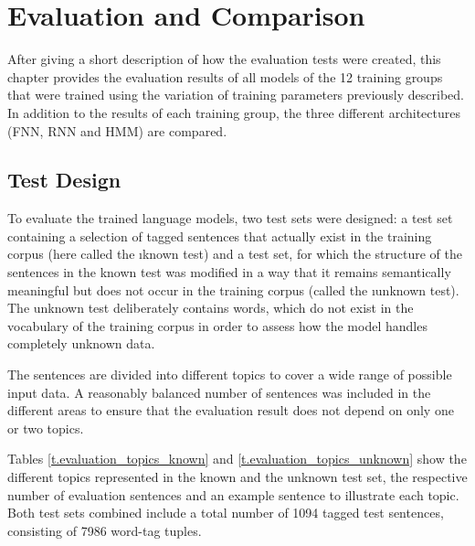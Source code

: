 \chapter{Evaluation and Comparison}\label{c.evaluation}
After giving a short description of how the evaluation tests were created, this chapter provides the evaluation results of all models of the 12 training groups that were trained using the variation of training parameters previously described. In addition to the results of each training group, the three different architectures (FNN, RNN and HMM) are compared.

\section{Test Design}\label{c.evaluation.test}
To evaluate the trained language models, two test sets were designed: a test set containing a selection of tagged sentences that actually exist in the training corpus (here called the \i{known test}) and a test set, for which the structure of the sentences in the known test was modified in a way that it remains semantically meaningful but does not occur in the training corpus (called the \i{unknown test}). The unknown test deliberately contains words, which do not exist in the vocabulary of the training corpus in order to assess how the model handles completely unknown data.

The sentences are divided into different topics to cover a wide range of possible input data. A reasonably balanced number of sentences was included in the different areas to ensure that the evaluation result does not depend on only one or two topics.

Tables \ref{t.evaluation_topics_known} and \ref{t.evaluation_topics_unknown} show the different topics represented in the known and the unknown test set, the respective number of evaluation sentences and an example sentence to illustrate each topic. Both test sets combined include a total number of 1094 tagged test sentences, consisting of 7986 word-tag tuples.

